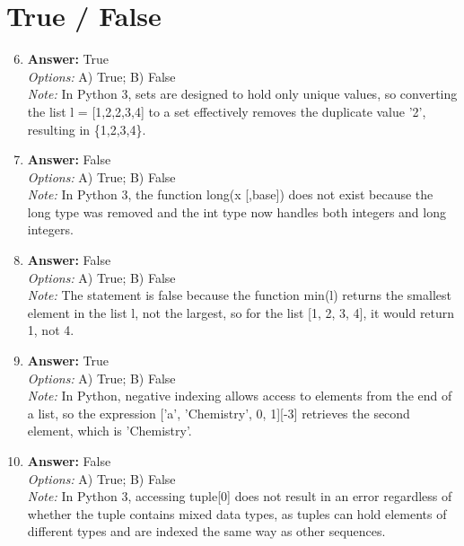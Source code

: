 \documentclass[12pt]{article}
\begin{document}
\section*{True / False}
\begin{enumerate}[label=\arabic*.]
\setcounter{enumi}{5}
\item \textbf{Answer:} True
\\ \textit{Options:} A) True; B) False
\\ \textit{Note:} In Python 3, sets are designed to hold only unique values, so converting the list l = [1,2,2,3,4] to a set effectively removes the duplicate value '2', resulting in \{1,2,3,4\}.
\item \textbf{Answer:} False
\\ \textit{Options:} A) True; B) False
\\ \textit{Note:} In Python 3, the function long(x [,base]) does not exist because the long type was removed and the int type now handles both integers and long integers.
\item \textbf{Answer:} False
\\ \textit{Options:} A) True; B) False
\\ \textit{Note:} The statement is false because the function min(l) returns the smallest element in the list l, not the largest, so for the list [1, 2, 3, 4], it would return 1, not 4.
\item \textbf{Answer:} True
\\ \textit{Options:} A) True; B) False
\\ \textit{Note:} In Python, negative indexing allows access to elements from the end of a list, so the expression ['a', 'Chemistry', 0, 1][-3] retrieves the second element, which is 'Chemistry'.
\item \textbf{Answer:} False
\\ \textit{Options:} A) True; B) False
\\ \textit{Note:} In Python 3, accessing tuple[0] does not result in an error regardless of whether the tuple contains mixed data types, as tuples can hold elements of different types and are indexed the same way as other sequences.
\end{enumerate}
\end{document}
